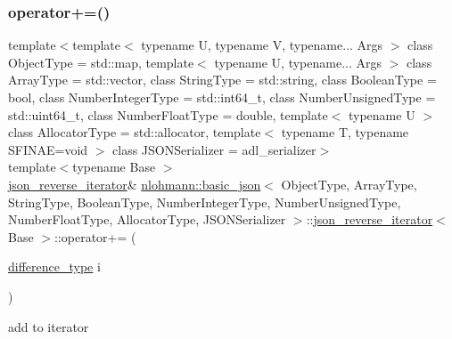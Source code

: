 \subsubsection{\texorpdfstring{operator+=()}{operator+=()}}
{\footnotesize\ttfamily template$<$template$<$ typename U, typename V, typename... Args $>$ class Object\+Type = std\+::map, template$<$ typename U, typename... Args $>$ class Array\+Type = std\+::vector, class String\+Type  = std\+::string, class Boolean\+Type  = bool, class Number\+Integer\+Type  = std\+::int64\+\_\+t, class Number\+Unsigned\+Type  = std\+::uint64\+\_\+t, class Number\+Float\+Type  = double, template$<$ typename U $>$ class Allocator\+Type = std\+::allocator, template$<$ typename T, typename S\+F\+I\+N\+A\+E=void $>$ class J\+S\+O\+N\+Serializer = adl\+\_\+serializer$>$ \\
template$<$typename Base $>$ \\
\hyperlink{classnlohmann_1_1basic__json_1_1json__reverse__iterator}{json\+\_\+reverse\+\_\+iterator}\& \hyperlink{classnlohmann_1_1basic__json}{nlohmann\+::basic\+\_\+json}$<$ Object\+Type, Array\+Type, String\+Type, Boolean\+Type, Number\+Integer\+Type, Number\+Unsigned\+Type, Number\+Float\+Type, Allocator\+Type, J\+S\+O\+N\+Serializer $>$\+::\hyperlink{classnlohmann_1_1basic__json_1_1json__reverse__iterator}{json\+\_\+reverse\+\_\+iterator}$<$ Base $>$\+::operator+= (\begin{DoxyParamCaption}\item[{\hyperlink{classnlohmann_1_1basic__json_afe7c1303357e19cea9527af4e9a31d8f}{difference\+\_\+type}}]{i }\end{DoxyParamCaption})\hspace{0.3cm}{\ttfamily [inline]}}



add to iterator 

\mbox{\label{classnlohmann_1_1basic__json_1_1json__reverse__iterator_a99b0f5e39f0edc9311e28d06e4f28db8}} 
